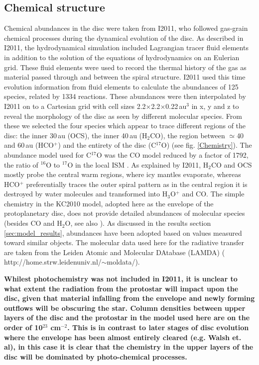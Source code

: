 \documentclass[useAMS,usenatbib]{mn2e}
\begin{document}
\subsection{Chemical structure} \label{subsec:chemical_structure}
Chemical abundances in the disc were taken from I2011, who followed gas-grain chemical processes during the dynamical evolution of the disc. As described in I2011, the hydrodynamical simulation included Lagrangian tracer fluid elements in addition to the solution of the equations of hydrodynamics on an Eulerian grid.  These fluid elements were used to record the thermal history of the gas as material passed through and between the spiral structure. I2011 used this time evolution information from fluid elements to calculate the abundances of 125 species, related by 1334 reactions.  These abundances were then interpolated by I2011 on to a Cartesian grid with cell sizes 2.2$\times$2.2$\times$0.22$\,$au$^3$ in x, y and z to reveal the morphology of the disc as seen by different molecular species. From these we selected the four species which appear to trace different regions of the disc: the inner 30\,au (OCS), the inner 40\,au (H$_2$CO),  the region between $\simeq$40 and 60\,au (HCO$^+$) and the entirety of the disc (C$^{17}$O) (see fig. \ref{Chemistry}). The abundance model used for C$^{17}$O was the CO model reduced by a factor of 1792, the ratio of $^{16}$O to $^{17}$O in the local ISM \citep{Wilson1994}. As explained by I2011,  H$_2$CO and OCS mostly probe the central warm regions, where icy mantles evaporate, whereas HCO$^+$ preferentially traces the outer spiral pattern as in the central region it is destroyed by water molecules and transformed into H$_3$O$^+$ and CO. The simple chemistry in the KC2010 model, adopted here as the envelope of the protoplanetary disc, does not provide detailed abundances of molecular species (besides CO and H$_2$O, see also \citealt{Caselli2012}). As discussed in the results section \ref{sec:model_results}, abundances have been adopted based on values measured toward similar objects. The molecular data used here for the radiative transfer are taken from the Leiden Atomic and Molecular DAtabase (LAMDA) (\citealt{Schoier2005} http://home.strw.leidenuniv.nl/$\sim$moldata/). \smallskip

{\bf Whilest photochemistry was not included in I2011, it is unclear to what extent the radiation from the protostar will impact upon the disc, given that material infalling from the envelope and newly forming outflows will be obscuring the star. Column densities between upper layers of the disc and the protostar in the model used here are on the order of 10$^{23}$ cm$^{-2}$. This is in contrast to later stages of disc evolution where the envelope has been almost entirely cleared (e.g. Walsh et. al), in this case it is clear that the chemistry in the upper layers of the disc will be dominated by photo-chemical processes.}
\end{document}
